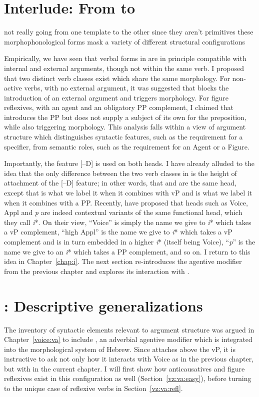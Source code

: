 {\section{Interlude: From {\tnif} to {\thif}} \label{vz:interim}
not really going from one template to the other since they aren't primitives
these morphophonological forms mask a variety of different structural configurations


Empirically, we have seen that verbal forms in {\tnif} are in principle compatible with internal and external arguments, though not within the same verb. I proposed that two distinct verb classes exist which share the same morphology. For non-active verbs, with no external argument, it was suggested that {\vz} blocks the introduction of an external argument and triggers {\tnif} morphology. For figure reflexives, with an agent and an obligatory PP complement, I claimed that {\pz} introduces the PP but does not supply a subject of its own for the preposition, while also triggering {\tnif} morphology. This analysis falls within a view of argument structure which distinguishes syntactic features, such as the requirement for a specifier, from semantic roles, such as the requirement for an Agent or a Figure.

Importantly, the feature [--D] is used on both heads. I have already alluded to the idea that the only difference between the two verb classes in {\tnif} is the height of attachment of the [--D] feature; in other words, that {\vz} and {\pz} are the same head, except that {\vz} is what we label it when it combines with vP and {\pz} is what we label it when it combines with a PP. Recently, \cite{woodmarantz17} have proposed that heads such as Voice, Appl and \emph{p} are indeed contextual variants of the same functional head, which they call \emph{i}*. On their view, ``Voice'' is simply the name we give to \emph{i}* which takes a vP complement, ``high Appl'' is the name we give to \emph{i}* which takes a vP complement and is in turn embedded in a higher \emph{i}* (itself being Voice), ``\emph{p}'' is the name we give to an \emph{i}* which takes a PP complement, and so on. I return to this idea in Chapter~\ref{chap:i}. The next section re-introduces the agentive modifier {\va} from the previous chapter and explores its interaction with {\vz}.


\section{\thit: Descriptive generalizations} \label{vz:thit}
The inventory of syntactic elements relevant to argument structure was argued in Chapter~\ref{voice:va} to include {\va}, an adverbial agentive modifier which is integrated into the morphological system of Hebrew. Since {\va} attaches above the vP, it is instructive to ask not only how it interacts with Voice as in the previous chapter, but with {\vz} in the current chapter. I will first show how anticausatives and figure reflexives exist in this configuration as well (Section~\ref{vz:va:easy}), before turning to the unique case of reflexive verbs in Section~\ref{vz:va:refl}.

}
